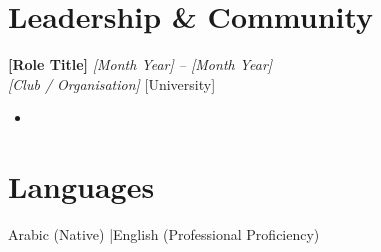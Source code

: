 \documentclass[11pt, a4paper]{article}
\newcommand{\cvitem}[4]{%
  \textbf{#1} \hfill \textit{#4} \\
  \textit{#2} \hfill #3 \\
}
\begin{document}
\vspace{4pt}

\section{Leadership \& Community}

\cvitem
  {[Role Title]}
  {[Club / Organisation]}
  {[University]}
  {[Month Year] -- [Month Year]}
\begin{itemize}
  \item [What you built, led, or changed — with metric]
\end{itemize}

\vspace{4pt}

\section{Languages}

Arabic (Native) \quad|\quad English (Professional Proficiency)
\end{document}
